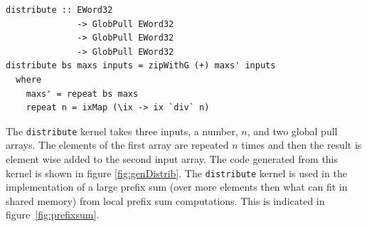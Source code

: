 \begin{small}
\begin{Verbatim}[samepage=true]
distribute :: EWord32 
              -> GlobPull EWord32
              -> GlobPull EWord32 
              -> GlobPull EWord32
distribute bs maxs inputs = zipWithG (+) maxs' inputs 
  where 
    maxs' = repeat bs maxs
    repeat n = ixMap (\ix -> ix `div` n)
\end{Verbatim} 
\end{small}

The {\tt distribute} kernel takes three inputs, a number, $n$,  and two global pull 
arrays. The elements of the first array are repeated $n$ times and then 
the result is element wise added to the second input array. The code generated 
from this kernel is shown in figure \ref{fig:genDistrib}. The 
{\tt distribute} kernel is used in the implementation of a large prefix sum 
(over more elements then what can fit in shared memory) from local prefix sum 
computations. This is indicated in figure~\ref{fig:prefixsum}.

